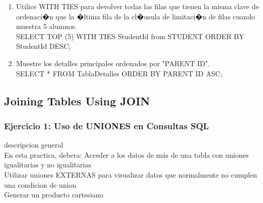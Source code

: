\documentclass[12pt,letterpaper]{article}
\begin{document}
\begin{enumerate}[1.]
\begin{enumerate}
	\item	Utilice WITH TIES para devolver todas las filas que tienen la misma clave de ordenaci�n que la �ltima fila de la cl�usula 			de limitaci�n de filas cuando muestra 5 alumnos.\\
	
		SELECT TOP (5) WITH TIES StudentId from STUDENT ORDER BY StudentId DESC;\\
 
	\item	Muestre los detalles principales ordenados por "PARENT ID".\\
	
		SELECT * FROM TablaDetalles ORDER BY PARENT ID ASC;\\

\end{enumerate}
\end{enumerate}
\newpage
\subsection{Joining Tables Using JOIN} 

\subsubsection{Ejercicio 1: Uso de UNIONES en Consultas SQL} 
descripcion general  \\
En esta practica, debera:
Acceder a los datos de más de una tabla con uniones igualitarias y no igualitarias\\
Utilizar uniones EXTERNAS para visualizar datos que normalmente no cumplen una condicion de union\\
Generar un producto cartesiano\\
 \\
\end{document}
